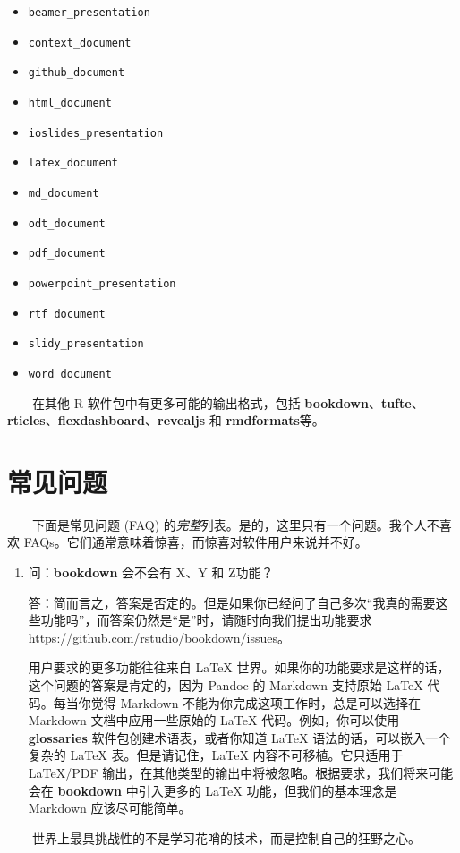 \documentclass[
  12pt,
]{krantz}
\providecommand{\tightlist}{%
  \setlength{\itemsep}{0pt}\setlength{\parskip}{0pt}}
\theoremstyle{definition}
\theoremstyle{definition}
\theoremstyle{definition}
\theoremstyle{definition}
\theoremstyle{remark}
\begin{document}
\begin{itemize}
\tightlist
\item
  \texttt{beamer\_presentation}
\item
  \texttt{context\_document}
\item
  \texttt{github\_document}
\item
  \texttt{html\_document}
\item
  \texttt{ioslides\_presentation}
\item
  \texttt{latex\_document}
\item
  \texttt{md\_document}
\item
  \texttt{odt\_document}
\item
  \texttt{pdf\_document}
\item
  \texttt{powerpoint\_presentation}
\item
  \texttt{rtf\_document}
\item
  \texttt{slidy\_presentation}
\item
  \texttt{word\_document}
\end{itemize}

  在其他 R 软件包中有更多可能的输出格式，包括 \textbf{bookdown}、\textbf{tufte}、\textbf{rticles}、\textbf{flexdashboard}、\textbf{revealjs} 和 \textbf{rmdformats}等。

\hypertarget{ux5e38ux89c1ux95eeux9898}{%
\chapter{常见问题}\label{ux5e38ux89c1ux95eeux9898}}

  下面是常见问题 (FAQ) 的\emph{完整}列表。是的，这里只有一个问题。我个人不喜欢 FAQs。它们通常意味着惊喜，而惊喜对软件用户来说并不好。

\begin{enumerate}
\def\labelenumi{\arabic{enumi}.}
\item
  问：\textbf{bookdown} 会不会有 X、Y 和 Z功能？

  答：简而言之，答案是否定的。但是如果你已经问了自己多次``我真的需要这些功能吗''，而答案仍然是``是''时，请随时向我们提出功能要求 \url{https://github.com/rstudio/bookdown/issues}。

  用户要求的更多功能往往来自 LaTeX 世界。如果你的功能要求是这样的话，这个问题的答案是肯定的，因为 Pandoc 的 Markdown 支持原始 LaTeX 代码。每当你觉得 Markdown 不能为你完成这项工作时，总是可以选择在 Markdown 文档中应用一些原始的 LaTeX 代码。例如，你可以使用 \textbf{glossaries} 软件包创建术语表，或者你知道 LaTeX 语法的话，可以嵌入一个复杂的 LaTeX 表。但是请记住，LaTeX 内容不可移植。它只适用于 LaTeX/PDF 输出，在其他类型的输出中将被忽略。根据要求，我们将来可能会在 \textbf{bookdown} 中引入更多的 LaTeX 功能，但我们的基本理念是 Markdown 应该尽可能简单。
\end{enumerate}

  世界上最具挑战性的不是学习花哨的技术，而是控制自己的狂野之心。

\backmatter

  

\printindex
\end{document}
